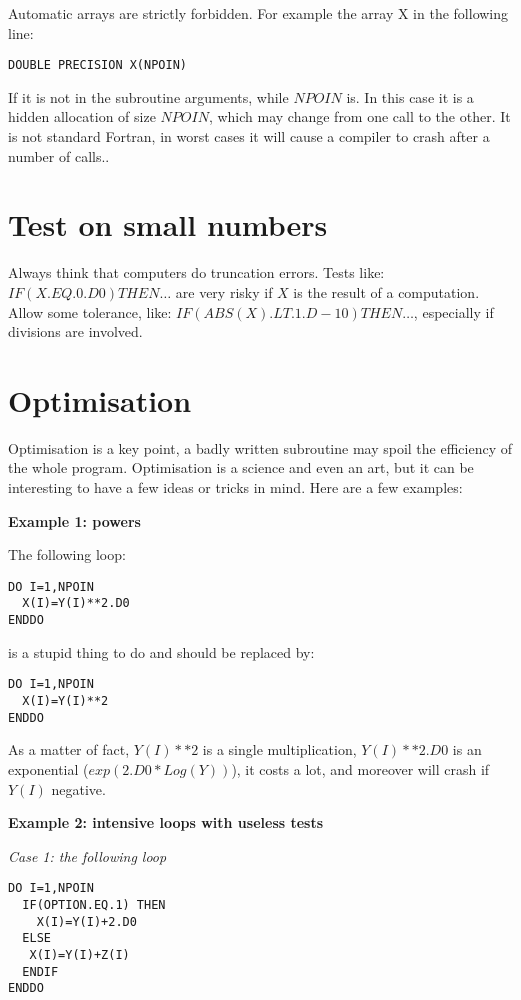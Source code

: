 Automatic arrays are strictly forbidden. For example the array X in the
following line:
\begin{lstlisting}
DOUBLE PRECISION X(NPOIN)
\end{lstlisting}

If it is not in the subroutine arguments, while $NPOIN$ is. In this case it is a
hidden allocation of size $NPOIN$, which may change from one call to the other.
It is not standard Fortran, in worst cases it will cause a compiler to crash
after a number of calls..

\section{Test on small numbers}

Always think that computers do truncation errors. Tests like: $IF(X.EQ.0.D0)
THEN…$ are very risky if $X$ is the result of a computation. Allow some tolerance,
like: $IF(ABS(X).LT.1.D-10) THEN…$, especially if divisions are involved.

\section{Optimisation}

Optimisation is a key point, a badly written subroutine may spoil the
efficiency of the whole program. Optimisation is a science and even an art, but
it can be interesting to have a few ideas or tricks in mind. Here are a few
examples:

\textbf{Example 1: powers}

The following loop:
\begin{lstlisting}
DO I=1,NPOIN
  X(I)=Y(I)**2.D0
ENDDO
\end{lstlisting}

is a stupid thing to do and should be replaced by:

\begin{lstlisting}
DO I=1,NPOIN
  X(I)=Y(I)**2
ENDDO
\end{lstlisting}

As a matter of fact, $Y(I)**2$ is a single multiplication, $Y(I)**2.D0$ is an
exponential ($exp(2.D0*Log (Y))$), it costs a lot, and moreover will crash if
$Y(I)$ negative.

\textbf{Example 2: intensive loops with useless tests}

\textit{Case 1: the following loop}

\begin{lstlisting}
DO I=1,NPOIN
  IF(OPTION.EQ.1) THEN
    X(I)=Y(I)+2.D0
  ELSE
   X(I)=Y(I)+Z(I)
  ENDIF
ENDDO
\end{lstlisting}

